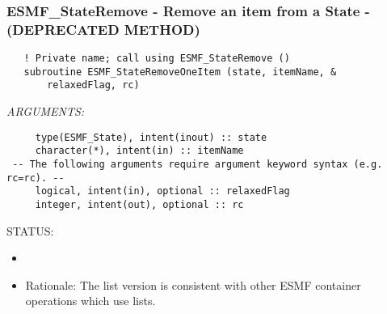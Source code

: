  
\setlength{\oldparskip}{\parskip}
\setlength{\parskip}{1.5ex}
\setlength{\oldparindent}{\parindent}
\setlength{\parindent}{0pt}
\setlength{\oldbaselineskip}{\baselineskip}
\setlength{\baselineskip}{11pt}
 
\def\bv{\begin{verbatim}}
\def\ev{\end{verbatim}}
\def\be{\begin{equation}}
\def\ee{\end{equation}}
\def\bea{\begin{eqnarray}}
\def\eea{\end{eqnarray}}
\def\bi{\begin{itemize}}
\def\ei{\end{itemize}}
\def\bn{\begin{enumerate}}
\def\en{\end{enumerate}}
\def\bd{\begin{description}}
\def\ed{\end{description}}
\def\({\left (}
\def\){\right )}
\def\[{\left [}
\def\]{\right ]}
\def\<{\left  \langle}
\def\>{\right \rangle}
\def\cI{{\cal I}}
\def\diag{\mathop{\rm diag}}
\def\tr{\mathop{\rm tr}}


 
\subsubsection [ESMF\_StateRemove] {ESMF\_StateRemove - Remove an item from a State - (DEPRECATED METHOD)}


  
\begin{verbatim}   ! Private name; call using ESMF_StateRemove ()
   subroutine ESMF_StateRemoveOneItem (state, itemName, &
       relaxedFlag, rc)\end{verbatim}{\em ARGUMENTS:}
\begin{verbatim}     type(ESMF_State), intent(inout) :: state
     character(*), intent(in) :: itemName
 -- The following arguments require argument keyword syntax (e.g. rc=rc). --
     logical, intent(in), optional :: relaxedFlag
     integer, intent(out), optional :: rc\end{verbatim}
{\sf STATUS:}
   \begin{itemize}
   \item{}
   \item{}
   Rationale: The list version is consistent with other ESMF container
   operations which use lists.
   \end{itemize}
  
